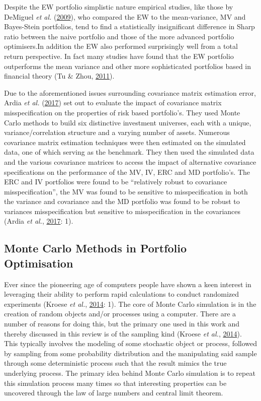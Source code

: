 \documentclass[11pt,preprint, authoryear]{elsarticle}
\numberwithin{equation}{section}
\numberwithin{figure}{section}
\numberwithin{table}{section}
\begin{document}
Despite the EW portfolio simplistic nature empirical studies, like those
by DeMiguel \emph{et al.} (\protect\hyperlink{ref-demiguel2009}{2009}),
who compared the EW to the mean-variance, MV and Bayes-Stein portfolios,
tend to find a statistically insignificant difference in Sharp ratio
between the naive portfolio and those of the more advanced portfolio
optimisers.In addition the EW also performed surprisingly well from a
total return perspective. In fact many studies have found that the EW
portfolio outperforms the mean variance and other more sophisticated
portfolios based in financial theory (Tu \& Zhou,
\protect\hyperlink{ref-tu2011}{2011}).

Due to the aforementioned issues surrounding covariance matrix
estimation error, Ardia \emph{et al.}
(\protect\hyperlink{ref-ardia2017}{2017}) set out to evaluate the impact
of covariance matrix misspecification on the properties of risk based
portfolio's. They used Monte Carlo methods to build six distinctive
investment universes, each with a unique, variance/correlation structure
and a varying number of assets. Numerous covariance matrix estimation
techniques were then estimated on the simulated data, one of which
serving as the benchmark. They then used the simulated data and the
various covariance matrices to access the impact of alternative
covariance specifications on the performance of the MV, IV, ERC and MD
portfolio's. The ERC and IV portfolios were found to be ``relatively
robust to covariance misspecification'', the MV was found to be
sensitive to misspecification in both the variance and covariance and
the MD portfolio was found to be robust to variances misspecification
but sensitive to misspecification in the covariances (Ardia \emph{et
al.}, \protect\hyperlink{ref-ardia2017}{2017}: 1).

\hypertarget{monte-carlo-methods-in-portfolio-optimisation}{%
\subsection{Monte Carlo Methods in Portfolio
Optimisation}\label{monte-carlo-methods-in-portfolio-optimisation}}

Ever since the pioneering age of computers people have shown a keen
interest in leveraging their ability to perform rapid calculations to
conduct randomized experiments (Kroese \emph{et al.},
\protect\hyperlink{ref-kroese2014}{2014}: 1). The core of Monte Carlo
simulation is in the creation of random objects and/or processes using a
computer. There are a number of reasons for doing this, but the primary
one used in this work and thereby discussed in this review is of the
sampling kind (Kroese \emph{et al.},
\protect\hyperlink{ref-kroese2014}{2014}). This typically involves the
modeling of some stochastic object or process, followed by sampling from
some probability distribution and the manipulating said sample through
some deterministic process such that the result mimics the true
underlying process. The primary idea behind Monte Carlo simulation is to
repeat this simulation process many times so that interesting properties
can be uncovered through the law of large numbers and central limit
theorem.
\end{document}
